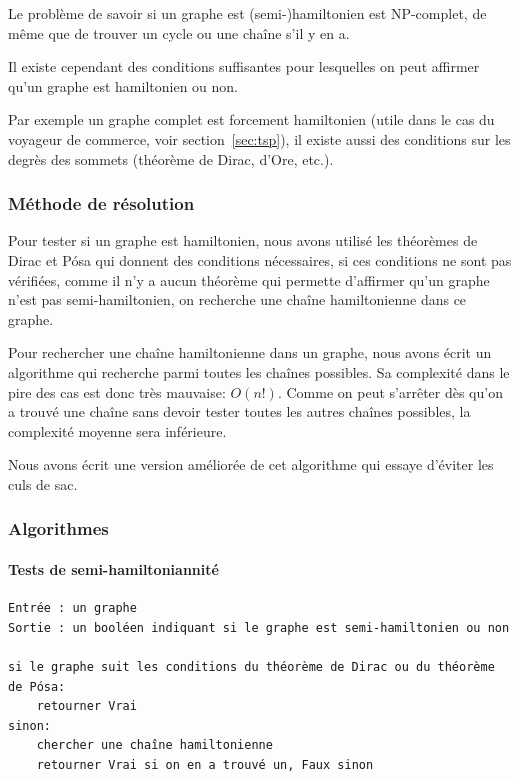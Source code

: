    Le problème de savoir si un graphe est (semi-)hamiltonien est NP-complet,
    de même que de trouver un cycle ou une chaîne s'il y en a.

    Il existe cependant des conditions suffisantes pour lesquelles on peut
    affirmer qu'un graphe est hamiltonien ou non.

    Par exemple un graphe complet est forcement hamiltonien (utile dans le cas
    du voyageur de commerce, voir section~\ref{sec:tsp}), il existe aussi des
    conditions sur les degrès des sommets (théorème de Dirac, d'Ore, etc.).

  \subsubsection{Méthode de résolution}
    Pour tester si un graphe est hamiltonien, nous avons utilisé les théorèmes
    de Dirac et Pósa qui donnent des conditions nécessaires, si ces conditions
    ne sont pas vérifiées, comme il n'y a aucun théorème qui permette
    d'affirmer qu'un graphe n'est pas semi-hamiltonien, on recherche une chaîne
    hamiltonienne dans ce graphe.

    Pour rechercher une chaîne hamiltonienne dans un graphe, nous avons écrit un
    algorithme qui recherche parmi toutes les chaînes possibles. Sa complexité
    dans le pire des cas est donc très mauvaise: $O(n!)$. Comme on peut
    s'arrêter dès qu'on a trouvé une chaîne sans devoir tester toutes les autres
    chaînes possibles, la complexité moyenne sera inférieure.

    Nous avons écrit une version améliorée de cet algorithme qui essaye
    d'éviter les culs de sac.

  \subsubsection{Algorithmes}
    \paragraph{Tests de semi-hamiltoniannité} \mbox{}
      \begin{lstlisting}
Entrée : un graphe
Sortie : un booléen indiquant si le graphe est semi-hamiltonien ou non

si le graphe suit les conditions du théorème de Dirac ou du théorème de Pósa:
    retourner Vrai
sinon:
    chercher une chaîne hamiltonienne
    retourner Vrai si on en a trouvé un, Faux sinon
      \end{lstlisting}

